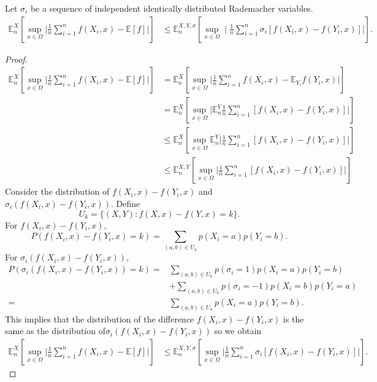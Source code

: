 \begin{lemma}\label{th:rademacherprocess}
Let $\sigma_{i}$ be a sequence of independent identically distributed Rademacher variables.
\[
\begin{aligned}
\mathbb{E}_n^{X}\left[\sup _{x \in \Omega} \big | \frac{1}{n} \sum_{i=1}^{n} f\left(X_{i}, x\right)-\mathbb{E}[f]\big | \right] 
& \leq \mathbb{E}_n^{X, Y, \sigma}\left[\sup _{x \in \Omega} \mid \frac{1}{n} \sum_{i=1}^{n} \sigma_{i}\left[f\left(X_{i}, x\right)-f\left(Y_{i}, x\right)\right]\big |\right].
\end{aligned}
\]
\end{lemma}
\begin{proof}
\begin{equation}
\begin{aligned} 
\mathbb{E}_n^{X}\left[\sup _{x \in \Omega} \big | \frac{1}{n} \sum_{i=1}^{n} f\left(X_{i}, x\right)-\mathbb{E}[f]\big | \right] 
&=\mathbb{E}_n^{X}\left[\sup _{x \in \Omega} \big |\frac{1}{n} \sum_{i=1}^{n} f\left(X_{i}, x\right)-\mathbb{E}_{Y_{i}} f\left(Y_{i}, x\right)\big |\right] 
\\
&=\mathbb{E}_n^{X}\left[\sup _{x \in \Omega} \big | \mathbb{E}_n^{Y} \frac{1}{n} \sum_{i=1}^{n}\left[f\left(X_{i}, x\right)-f\left(Y_{i}, x\right)\right]\big | \right] 
\\
& \leq \mathbb{E}_n^{X}\left[\sup _{x \in \Omega} \mathbb{E}_n^{Y}\big |\frac{1}{n} \sum_{i=1}^{n}\left[f\left(X_{i}, x\right)-f\left(Y_{i}, x\right)\right]\big |\right]
\\
& \leq \mathbb{E}_n^{X, Y}\left[\sup _{x \in \Omega} \big | \frac{1}{n} \sum_{i=1}^{n}\left[f\left(X_{i}, x\right)-f\left(Y_{i}, x\right)\right]\big |\right]
\end{aligned}
\end{equation}
Consider the distribution of $f(X_{i}, x)-f(Y_{i}, x)$ and $\sigma_{i}(f(X_{i}, x)-f(Y_{i}, x))$. Define
$$
U_k=\{(X, Y): f(X,x)-f(Y,x)=k\}.
$$
For $f(X_{i}, x)-f(Y_{i}, x)$,
\begin{equation}
P(f(X_{i}, x)-f(Y_{i}, x)=k)=\sum_{(a, b)\in U_k} p(X_i=a)p(Y_i=b).
\end{equation}
For $\sigma_{i}(f(X_{i}, x)-f(Y_{i}, x))$,
\begin{align}
P(\sigma_{i}(f(X_{i}, x)-f(Y_{i}, x))=k)=&\sum_{(a, b)\in U_k} p(\sigma_i=1)p(X_i=a)p(Y_i=b) \\
&+ \sum_{(a, b)\in U_k} p(\sigma_i=-1)p(X_i=b)p(Y_i=a)\\
=&\sum_{(a, b)\in U_k} p(X_i=a)p(Y_i=b).
\end{align}
This implies that the distribution of the difference $f\left(X_{i}, x\right)-f\left(Y_{i}, x\right)$ is the same as the distribution of$\sigma_{i}(f(X_{i}, x)-f(Y_{i}, x))$ so we obtain
\[
\begin{aligned}
\mathbb{E}_n^{X}\left[\sup _{x \in \Omega} \big | \frac{1}{n} \sum_{i=1}^{n} f\left(X_{i}, x\right)-\mathbb{E}[f]\big |\right] 
& \leq \mathbb{E}_n^{X, Y, \sigma}\left[\sup _{x \in \Omega} \big | \frac{1}{n} \sum_{i=1}^{n} \sigma_{i}\left[f\left(X_{i}, x\right)-f\left(Y_{i}, x\right)\right]\big |\right].
\end{aligned}
\]



\end{proof}
